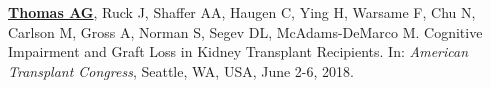 \documentclass[10pt]{article}
\makeatletter
\newlength{\bibhang}
\newlength{\bibsep}
 {\@listi \global\bibsep\itemsep \global\advance\bibsep by\parsep}
\newenvironment{bibenum*}
  {\renewcommand\labelenumi{[\theenumi]}%
   \etaremune[
     topsep=0pt,
     itemsep=\bibsep,
     parsep=0pt,partopsep=0pt,
     itemindent=-\bibhang,
     leftmargin={\bibhang+\widthof{[999]}}]}
  {\endetaremune}
\makeatother
\begin{document}
\begin{bibenum*}
\item \underline{\textbf{Thomas AG}}, Ruck J, Shaffer AA, Haugen C,
  Ying H, Warsame F, Chu N, Carlson M, Gross A, Norman S, Segev DL,
  McAdams-DeMarco M.
  Cognitive Impairment and Graft Loss in Kidney Transplant Recipients.
  In: \emph{American Transplant Congress},
  Seattle, WA, USA, June 2-6, 2018.








\end{bibenum*}
\end{document}
